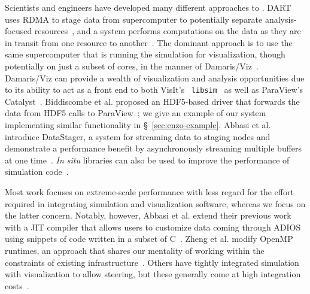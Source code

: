 Scientists and engineers have developed many different approaches
to \insitu{}.  DART uses RDMA to stage data from supercomputer to
potentially separate analysis-focused
resources~\cite{Docan:2010:DART}, and a system performs computations on
the data as they are in transit from one resource to
another~\cite{Moreland:2011:InTransit}.  The dominant approach is
to use the same supercomputer that is running the simulation for
visualization, though potentially on just a subset of cores, in the
manner of
Damaris/Viz~\cite{Dorier:2013:Damaris}.  Damaris/Viz can provide a
wealth of visualization and analysis opportunities due to its ability
to act as a
front end to both VisIt's~\cite{Childs:2012:VisIt}
\texttt{libsim}~\cite{Whitlock:2011:Libsim} as well as ParaView's
Catalyst~\cite{Fabian:2011:Catalyst, CatalystUserGuide}.  Biddiscombe
et al. proposed an HDF5-based driver that forwards the data from HDF5
calls to ParaView~\cite{Biddiscombe:2011:HDF5Steering}; we give an
example of our system implementing similar functionality in
\S~\ref{sec:enzo-example}.  Abbasi et al. introduce DataStager,
a system for streaming data to staging nodes and demonstrate a
performance benefit by asynchronously streaming multiple buffers at one
time~\cite{Abbasi:2009:DataStager}. \textit{In situ} libraries can also
be used to improve the performance of simulation
code~\cite{Vishwanath:2011:Leadership}.

Most work focuses on extreme-scale performance with less regard for the
effort required in integrating simulation and visualization software,
whereas we focus on the latter concern.  Notably, however, Abbasi et
al. extend their previous work with a JIT compiler that allows users to
customize data coming through
ADIOS~\cite{Lofstead:2008:ADIOS} using snippets of code written in a
subset of
C~\cite{Abbasi:2011:JITStaging}.  Zheng et al. modify OpenMP runtimes,
an approach that shares our mentality of working within the
constraints of existing
infrastructure~\cite{Zheng:2013:GoldRush}.  Others have tightly
integrated simulation with visualization to allow steering, but these
generally come at high integration costs~\cite{Lesage:2012:FlowSitu,
Ament:2011:Steering}.



